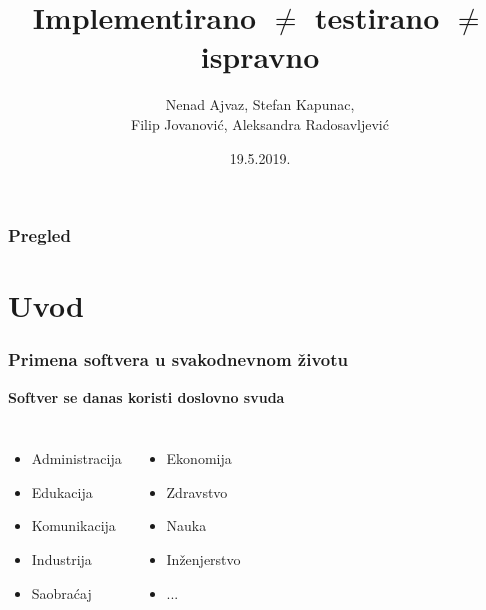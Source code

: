\documentclass{beamer}
\title[Pouzdanost softvera]{Implementirano $\neq$ testirano $\neq$ ispravno}
\author{Nenad Ajvaz, Stefan Kapunac,\\ Filip Jovanović, Aleksandra Radosavljević}
\institute[MATF]
{
Univerzitet u Beogradu, Matematički fakultet \\
\medskip
}
\date{19.5.2019.}
\begin{document}
\begin{frame}
\titlepage
\end{frame}

\begin{frame}
\frametitle{Pregled}
\tableofcontents
\end{frame}


\section{Uvod}
\begin{frame} 
\frametitle{Primena softvera u svakodnevnom životu}
\textbf{Softver se danas koristi doslovno svuda}

\begin{columns}[c]
\begin{itemize}
\item Administracija
\item Edukacija
\item Komunikacija
\item Industrija
\item Saobraćaj
\end{itemize}

\begin{itemize}
\item Ekonomija
\item Zdravstvo
\item Nauka
\item Inženjerstvo
\item ...
\end{itemize}
\end{columns}
\end{frame}
\end{document}

